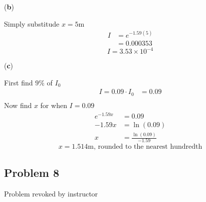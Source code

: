 \documentclass{article}
\begin{document}
(\textbf{b})

Simply substitude $ x = 5 $m
\begin{align*}
    I & = e^{-1.59(5)} \\
      & = 0.000353
\end{align*}
\begin{equation*}
    \boxed{I = 3.53 \times 10^{-4}}
\end{equation*}

(\textbf{c})

First find $ 9\% $ of $ I_0 $
\begin{align*}
    I = 0.09 \cdot I_0 & = 0.09 \\
\end{align*}
Now find $ x $ for when $ I = 0.09 $
\begin{align*}
    e^{-1.59x} & = 0.09 \\
    -1.59x & = \ln(0.09) \\
    x & = \frac{\ln(0.09)}{-1.59}
\end{align*}
\begin{equation*}
    \boxed{x = 1.514 \text{m, rounded to the nearest hundredth}}
\end{equation*}

\subsection{Problem 8}

Problem revoked by instructor
\end{document}
